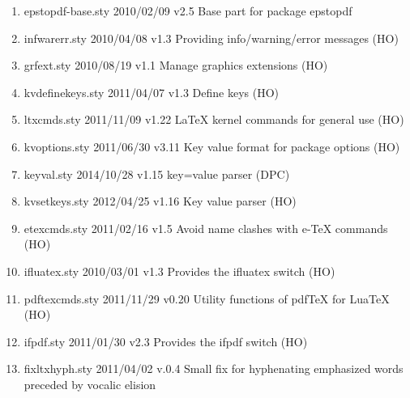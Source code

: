 \begin{enumerate}
\item epstopdf-base.sty 2010/02/09 v2.5 Base part for package epstopdf
\item infwarerr.sty 2010/04/08 v1.3 Providing info/warning/error messages (HO)
\item grfext.sty 2010/08/19 v1.1 Manage graphics extensions (HO)
\item kvdefinekeys.sty 2011/04/07 v1.3 Define keys (HO)
\item ltxcmds.sty 2011/11/09 v1.22 LaTeX kernel commands for general use (HO)
\item kvoptions.sty 2011/06/30 v3.11 Key value format for package options (HO)
\item keyval.sty 2014/10/28 v1.15 key=value parser (DPC)
\item kvsetkeys.sty 2012/04/25 v1.16 Key value parser (HO)
\item etexcmds.sty 2011/02/16 v1.5 Avoid name clashes with e-TeX commands (HO)
\item ifluatex.sty 2010/03/01 v1.3 Provides the ifluatex switch (HO)
\item pdftexcmds.sty 2011/11/29 v0.20 Utility functions of pdfTeX for LuaTeX (HO)
\item ifpdf.sty 2011/01/30 v2.3 Provides the ifpdf switch (HO)


\item fixltxhyph.sty 2011/04/02 v.0.4 Small fix for hyphenating emphasized words preceded by vocalic elision
\end{enumerate}
